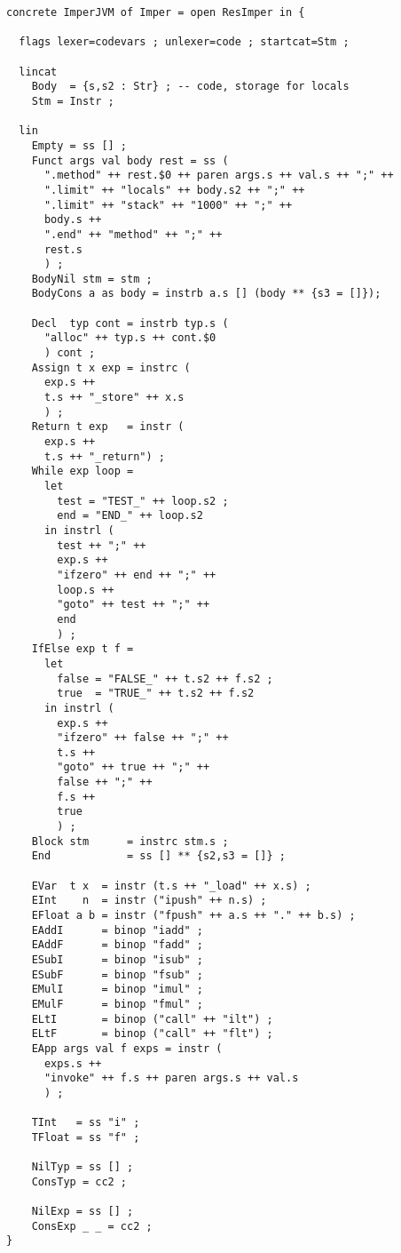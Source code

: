 \documentclass[12pt]{article}
\begin{document}
\small
\begin{verbatim}
concrete ImperJVM of Imper = open ResImper in {

  flags lexer=codevars ; unlexer=code ; startcat=Stm ;

  lincat
    Body  = {s,s2 : Str} ; -- code, storage for locals
    Stm = Instr ;

  lin
    Empty = ss [] ;
    Funct args val body rest = ss (
      ".method" ++ rest.$0 ++ paren args.s ++ val.s ++ ";" ++
      ".limit" ++ "locals" ++ body.s2 ++ ";" ++
      ".limit" ++ "stack" ++ "1000" ++ ";" ++
      body.s ++
      ".end" ++ "method" ++ ";" ++
      rest.s 
      ) ;
    BodyNil stm = stm ;
    BodyCons a as body = instrb a.s [] (body ** {s3 = []});

    Decl  typ cont = instrb typ.s (
      "alloc" ++ typ.s ++ cont.$0
      ) cont ;
    Assign t x exp = instrc (
      exp.s ++ 
      t.s ++ "_store" ++ x.s
      ) ;
    Return t exp   = instr (
      exp.s ++ 
      t.s ++ "_return") ;
    While exp loop = 
      let 
        test = "TEST_" ++ loop.s2 ; 
        end = "END_" ++ loop.s2
      in instrl (
        test ++ ";" ++
        exp.s ++ 
        "ifzero" ++ end ++ ";" ++ 
        loop.s ++
        "goto" ++ test ++ ";" ++ 
        end
        ) ;
    IfElse exp t f = 
      let 
        false = "FALSE_" ++ t.s2 ++ f.s2 ; 
        true  = "TRUE_" ++ t.s2 ++ f.s2
      in instrl (
        exp.s ++ 
        "ifzero" ++ false ++ ";" ++ 
        t.s ++
        "goto" ++ true ++ ";" ++
        false ++ ";" ++
        f.s ++ 
        true
        ) ;
    Block stm      = instrc stm.s ;
    End            = ss [] ** {s2,s3 = []} ;

    EVar  t x  = instr (t.s ++ "_load" ++ x.s) ;
    EInt    n  = instr ("ipush" ++ n.s) ;
    EFloat a b = instr ("fpush" ++ a.s ++ "." ++ b.s) ;
    EAddI      = binop "iadd" ;
    EAddF      = binop "fadd" ;
    ESubI      = binop "isub" ;
    ESubF      = binop "fsub" ;
    EMulI      = binop "imul" ;
    EMulF      = binop "fmul" ;
    ELtI       = binop ("call" ++ "ilt") ;
    ELtF       = binop ("call" ++ "flt") ;
    EApp args val f exps = instr (
      exps.s ++
      "invoke" ++ f.s ++ paren args.s ++ val.s
      ) ;

    TInt   = ss "i" ;
    TFloat = ss "f" ;

    NilTyp = ss [] ;
    ConsTyp = cc2 ;

    NilExp = ss [] ;
    ConsExp _ _ = cc2 ;
}

\end{verbatim}
\normalsize
\newpage
\end{document}
